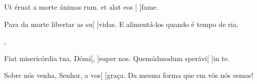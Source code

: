 {{\item {}Ut éruat a morte ánimas rum. {\ResponsoriumC} et alat eos [ ]{fa}me.~\Responsorium}%
{\item {}Para da morte libertar as su[ ]{vi}das. {\ResponsoriumC} E alimen\-tá-los quando é tempo de ria.~\Responsorium},
{\item {}Fiat misericórdia tua, Dómi[, ]{su}per nos. {\ResponsoriumC} Quemádmodum sperávi[ ]{in} te.~\Responsorium}%
{\item {}Sobre nós venha, Senhor, a vos[ ]{gra}ça. {\ResponsoriumC} Da mesma forma que em vós nós esmos!~\Responsorium}
}